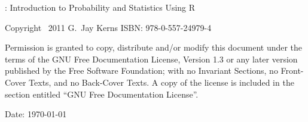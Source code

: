 

\setcounter{page}{2}

\noindent \IPSUR: Introduction to Probability and Statistics Using \textsf{R}

\noindent Copyright \textcopyright~2011 G.~Jay Kerns
\noindent ISBN: 978-0-557-24979-4
\medskip{}


\noindent Permission is granted to copy, distribute and/or modify
this document under the terms of the GNU Free Documentation License,
Version 1.3 or any later version published by the Free Software Foundation; with no Invariant Sections, no Front-Cover Texts, and no Back-Cover Texts. A copy of the license is included in the section entitled ``GNU Free Documentation License''.

\noindent \bigskip{}
\noindent Date: \today
\noindent \vfill{}

\cleardoublepage
{}
{}

\tableofcontents{}


